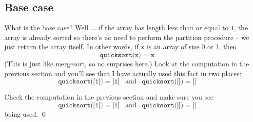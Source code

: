 \newpage
\subsection{Base case}

What is the base case?
Well ... if the array has length less than or equal to $1$,
the array is already sorted so there's no need to perform 
the partition procedure -- we just return the array itself.
In other words, if \verb!x! is an array of size 0 or 1, then 
\[
\texttt{quicksort(x) = x}
\]
(This is just like mergesort, so no surprises here.)
Look at the computation in the previous section and you'll see that
I have actually used this fact in two places:
\[
\texttt{quicksort([1])} 
= 
\texttt{[1]}
\,\,\, 
\text{ and }
\,\,\,
\texttt{quicksort([])} 
= \texttt{[]} 
\]

\begin{ex}
Check the computation in the previous section
and make sure you see 
\[
\texttt{quicksort([1])} 
= 
\texttt{[1]}
\,\,\, 
\text{ and }
\,\,\,
\texttt{quicksort([])} 
= 
\texttt{[]} 
\]
being used.
\qed
\end{ex}

